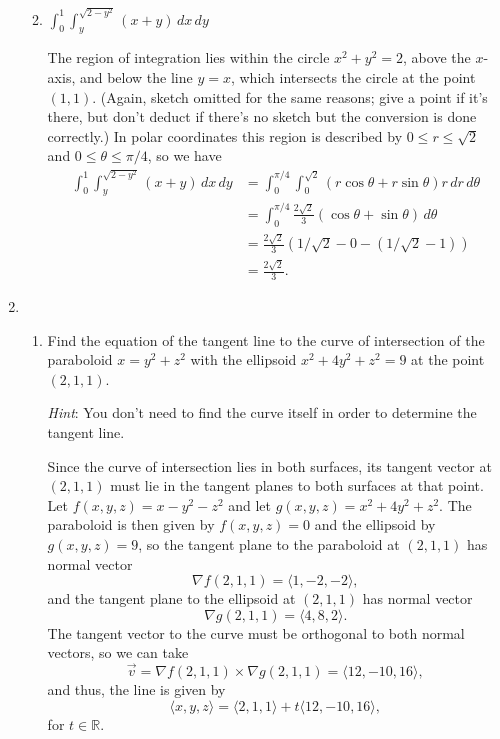 \documentclass[12pt]{article}
\newcommand{\points}[1]{\marginpar{\hspace{24pt}[#1]}}
\newcommand{\R}{\mathbb{R}}
\newcommand{\di}{\displaystyle}
\begin{document}
\begin{enumerate}
\begin{enumerate}
\bigskip

\item $\di \int_0^1\int_y^{\sqrt{2-y^2}}(x+y)\,dx\,dy$ \points{6}

\bigskip

The region of integration lies within the circle $x^2+y^2=2$, above the $x$-axis, and below the line $y=x$, which intersects the circle at the point $(1,1)$. (Again, sketch omitted for the same reasons; give a point if it's there, but don't deduct if there's no sketch but the conversion is done correctly.) In polar coordinates this region is described by $0\leq r\leq \sqrt{2}$ and $0\leq \theta\leq \pi/4$, so we have
\begin{align*}
\int_0^1\int_y^{\sqrt{2-y^2}}(x+y)\,dx\,dy & = \int_0^{\pi/4}\int_0^{\sqrt{2}}(r\cos\theta+r\sin\theta)r\,dr\,d\theta\\
& = \int_0^{\pi/4} \frac{2\sqrt{2}}{3}(\cos\theta+\sin\theta)\,d\theta\\
& = \frac{2\sqrt{2}}{3}(1/\sqrt{2}-0-(1/\sqrt{2}-1))\\
& = \frac{2\sqrt{2}}{3}.
\end{align*}
\end{enumerate}
\newpage

\item \begin{enumerate}
\item Find the equation of the tangent line to the curve of intersection of the paraboloid $x=y^2+z^2$ with the ellipsoid $x^2+4y^2+z^2=9$ at the point $(2,1,1)$.\points{6}

{\em Hint}: You don't need to find the curve itself in order to determine the tangent line.

\bigskip

Since the curve of intersection lies in both surfaces, its tangent vector at $(2,1,1)$ must lie in the tangent planes to both surfaces at that point. Let $f(x,y,z) = x-y^2-z^2$ and let $g(x,y,z) = x^2+4y^2+z^2$. The paraboloid is then given by $f(x,y,z)=0$ and the ellipsoid by $g(x,y,z)=9$, so the tangent plane to the paraboloid at $(2,1,1)$ has normal vector
\[
\nabla f(2,1,1) = \langle 1, -2, -2\rangle,
\]
and the tangent plane to the ellipsoid at $(2,1,1)$ has normal vector 
\[
\nabla g(2,1,1) = \langle 4, 8, 2\rangle.
\]
The tangent vector to the curve must be orthogonal to both normal vectors, so we can take
\[
\vec{v} = \nabla f(2,1,1)\times \nabla g(2,1,1) = \langle 12, -10, 16\rangle,
\]
and thus, the line is given by
\[
\langle x,y,z\rangle = \langle 2,1,1\rangle + t\langle 12, -10, 16\rangle,
\]
for $t\in \R$.


\end{enumerate}
\end{enumerate}
\end{document}
